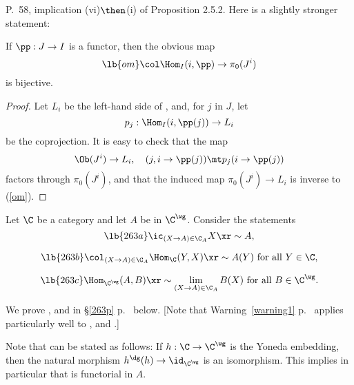 \documentclass[12pt]{article}
\theoremstyle{remark}
\theoremstyle{definition}
\begin{document}
\begin{s} 
P.~58, implication (vi)$\then$(i) of Proposition 2.5.2. Here is a slightly stronger statement:

\begin{prop} 
If $\pp:J\to I$ is a functor, then the obvious map
\begin{equation}\lb{om}
\col\Hom_I(i,\pp)\to\pi_0(J^i)
\end{equation}
is bijective. 
\end{prop}

\begin{proof} 
Let $L_i$ be the left-hand side of , and, for $j$ in $J$, let 
$$
p_j:\Hom_I(i,\pp(j))\to L_i
$$
be the coprojection. It is easy to check that the map 
$$
\Ob(J^i)\to L_i,\quad(j,i\to\pp(j))\mt p_j(i\to\pp(j))
$$
factors through $\pi_0(J^i)$, and that the induced map $\pi_0(J^i)\to L_i$ is inverse to (\ref{om}). %
\end{proof}
\end{s}

%


Let $\C$ be a category and let $A$ be in $\C^\wg$. Consider the statements
\begin{equation}\lb{263a}
\ic_{(X\to A)\in\C_A}X\xr\sim A,
\end{equation}

\begin{equation}\lb{263b}
\col_{(X\to A)\in\C_A}\Hom_\C(Y,X)\xr\sim A(Y)\text{ for all }Y\in\C, 
\end{equation}

\begin{equation}\lb{263c}
\Hom_{\C^\wg}(A,B)\xr\sim\lim_{(X\to A)\in\C_A}B(X)\text{ for all }B\in\C^\wg. 
\end{equation}

We prove ,  and  in \S\ref{263p} p.~ below. [Note that Warning~\ref{warning1} p.~ applies particularly well to ,  and .] %

Note that  can be stated as follows: If $h:\C\to\C^\wg$ is the Yoneda embedding, then the natural morphism $h^\dg(h)\to\id_{\C^\wg}$ is an isomorphism. This implies in particular that  is functorial in $A$.
\end{document}
